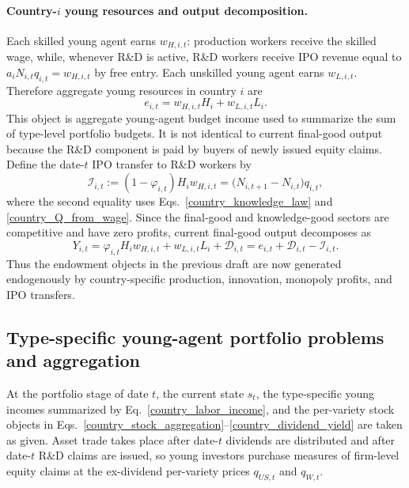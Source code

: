\documentclass{article}
\def\green#1{#1}%
\begin{document}
\paragraph{Country-$i$ young resources and output decomposition.}
Each skilled young agent earns $w_{H,i,t}$: production workers receive the skilled wage, while, \green{whenever R}\&\green{D is active}, R\&D workers receive IPO revenue equal to $a_iN_{i,t}q_{i,t}=w_{H,i,t}$ by free entry. Each unskilled young agent earns $w_{L,i,t}$. Therefore aggregate young resources in country $i$ are
\begin{equation}\label{country_labor_income}
e_{i,t}=w_{H,i,t}H_i+w_{L,i,t}L_i.
\end{equation}
This object is aggregate young-agent budget income used to summarize the sum of type-level portfolio budgets. It is not identical to current final-good output because the R\&D component is paid by buyers of newly issued equity claims. Define the date-$t$ IPO transfer to R\&D workers by
\begin{equation}\label{country_ipo_transfer}
\mathcal I_{i,t}
:=(1-\varphi_{i,t})H_iw_{H,i,t}
=\bigl(N_{i,t+1}-N_{i,t}\bigr)q_{i,t},
\end{equation}
where the second equality uses Eqs.~\eqref{country_knowledge_law} and \eqref{country_Q_from_wage}. Since the final-good and knowledge-good sectors are competitive and have zero profits, current final-good output decomposes as
\begin{equation}\label{country_output_income_identity}
Y_{i,t}
=
\varphi_{i,t}H_iw_{H,i,t}+w_{L,i,t}L_i+\mathcal D_{i,t}
=
e_{i,t}+\mathcal D_{i,t}-\mathcal I_{i,t}.
\end{equation}
Thus the endowment objects in the previous draft are now generated endogenously by country-specific production, innovation, monopoly profits, and IPO transfers.


\subsection{Type-specific young-agent portfolio problems and aggregation}

At the portfolio stage of date $t$, the current state $s_t$, the type-specific young incomes summarized by Eq.~\eqref{country_labor_income}, and the per-variety stock objects in Eqs.~\eqref{country_stock_aggregation}--\eqref{country_dividend_yield} are taken as given. Asset trade takes place after date-$t$ dividends are distributed and after date-$t$ R\&D claims are issued, so young investors purchase measures of firm-level equity claims at the ex-dividend per-variety prices $q_{US,t}$ and $q_{W,t}$.
\end{document}
